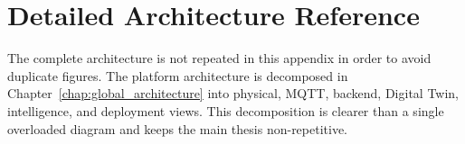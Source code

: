 \chapter{Detailed Architecture Reference}
\label{app:detailed_architecture_reference}

The complete architecture is not repeated in this appendix in order to avoid duplicate figures. The platform architecture is decomposed in Chapter~\ref{chap:global_architecture} into physical, MQTT, backend, Digital Twin, intelligence, and deployment views. This decomposition is clearer than a single overloaded diagram and keeps the main thesis non-repetitive.
